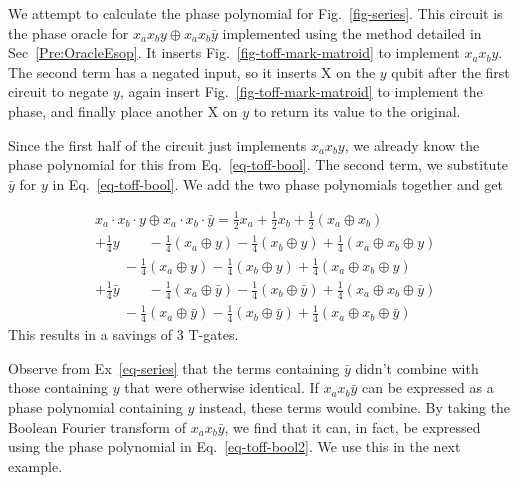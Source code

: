 \begin{example}
  \label{ex-series}
  We attempt to calculate the phase polynomial for Fig.~\ref{fig-series}. This circuit
  is the phase oracle for $x_a x_b y \oplus x_a x_b \bar{y}$ implemented using
  the method detailed in Sec~\ref{Pre:OracleEsop}. It inserts
  Fig.~\ref{fig-toff-mark-matroid} to implement $x_a x_b y$. The second term has a negated
  input, so it inserts X on the $y$ qubit after the first circuit to negate $y$, again
  insert Fig.~\ref{fig-toff-mark-matroid} to implement the phase, and finally place another
  X on $y$ to return its value to the original.

  Since the first half of the circuit just implements $x_a x_b y$, we already know
  the phase polynomial for this from Eq.~\ref{eq-toff-bool}. The second term, we
  substitute $\bar{y}$ for $y$ in Eq.~\ref{eq-toff-bool}. We add the two phase
  polynomials together and get

  \begin{equation}
    \label{eq-series}
    \begin{aligned}
      &x_a \cdot x_b \cdot y \oplus x_a \cdot x_b \cdot \bar{y} = \frac{1}{2}x_a +
      \frac{1}{2}x_b +\frac{1}{2}(x_a \oplus x_b) \\
      & + \frac{1}{4}y \qquad -\frac{1}{4}(x_a \oplus y) - \frac{1}{4}(x_b \oplus y) +
      \frac{1}{4}(x_a \oplus x_b \oplus y)\\
      &\qquad -\frac{1}{4}(x_a \oplus y) - \frac{1}{4}(x_b \oplus y) +
      \frac{1}{4}(x_a \oplus x_b \oplus y)\\
      & + \frac{1}{4}\bar{y} \qquad -\frac{1}{4}(x_a \oplus \bar{y})
      - \frac{1}{4}(x_b \oplus \bar{y}) +
      \frac{1}{4}(x_a \oplus x_b \oplus \bar{y})\\
      &\qquad -\frac{1}{4}(x_a \oplus \bar{y}) - \frac{1}{4}(x_b \oplus \bar{y}) +
      \frac{1}{4}(x_a \oplus x_b \oplus \bar{y})
    \end{aligned}
  \end{equation}
  This results in a savings of 3 T-gates. 
\end{example}

Observe from Ex~\ref{eq-series} that the terms containing $\bar{y}$ didn't combine with
those containing $y$ that were otherwise identical. If $x_a x_b \bar{y}$ can be expressed
as a phase polynomial containing $y$ instead, these terms would combine. By taking the
Boolean Fourier transform of $x_a x_b \bar{y}$, we find that it can, in fact, be expressed
using the phase polynomial in Eq.~\ref{eq-toff-bool2}. We use this in the next example.

